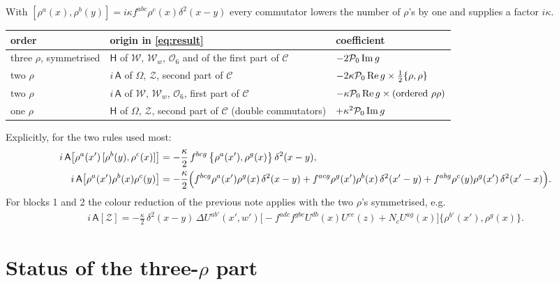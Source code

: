 \documentclass[10pt]{article}
\numberwithin{equation}{section}
\begin{document}
With $[\rho^{a}(x),\rho^{b}(y)]=i\kappa f^{abc}\rho^{c}(x)\delta^{2}(x-y)$ every commutator lowers the number of $\rho$'s by one and supplies a factor $i\kappa$.
\begin{center}
\renewcommand{\arraystretch}{1.4}
\begin{tabular}{l|l|l}
order & origin in \eqref{eq:result} & coefficient\\ \hline
three $\rho$, symmetrised & $\mathsf{H}$ of $\mathcal{W}$, $\mathcal{W}_{w}$, $\mathcal{O}_{6}$ and of the first part of $\mathcal{C}$ & $-2\mathcal{P}_{0}\,{\rm Im}\,g$\\
two $\rho$ & $i\,\mathsf{A}$ of $\Omega$, $\mathcal{Z}$, second part of $\mathcal{C}$ & $-2\kappa\mathcal{P}_{0}\,{\rm Re}\,g\times\tfrac12\{\rho,\rho\}$\\
two $\rho$ & $i\,\mathsf{A}$ of $\mathcal{W}$, $\mathcal{W}_{w}$, $\mathcal{O}_{6}$, first part of $\mathcal{C}$ & $-\kappa\mathcal{P}_{0}\,{\rm Re}\,g\times(\text{ordered }\rho\rho)$\\
one $\rho$ & $\mathsf{H}$ of $\Omega$, $\mathcal{Z}$, second part of $\mathcal{C}$ (double commutators) & $+\kappa^{2}\mathcal{P}_{0}\,{\rm Im}\,g$
\end{tabular}
\end{center}
Explicitly, for the two rules used most:
\begin{align}
i\,\mathsf{A}\big[\rho^{a}(x')\,[\rho^{b}(y),\rho^{c}(x)]\big]&=-\frac{\kappa}{2}\,f^{bcg}\,\big\{\rho^{a}(x'),\rho^{g}(x)\big\}\,\delta^{2}(x-y),\notag\\
i\,\mathsf{A}\big[\rho^{a}(x')\rho^{b}(x)\rho^{c}(y)\big]&=-\frac{\kappa}{2}\Big(f^{bcg}\rho^{a}(x')\rho^{g}(x)\,\delta^{2}(x-y)+f^{acg}\rho^{g}(x')\rho^{b}(x)\,\delta^{2}(x'-y)+f^{abg}\rho^{c}(y)\rho^{g}(x')\,\delta^{2}(x'-x)\Big).
\end{align}
For blocks 1 and 2 the colour reduction of the previous note applies with the two $\rho$'s symmetrised, e.g.
\begin{align}
i\,\mathsf{A}[\mathcal{Z}]=-\frac{\kappa}{2}\,\delta^{2}(x-y)\,\Delta U^{ab'}(x',w')\Big[-f^{adc}f^{gbe}U^{db}(x)U^{ce}(z)+N_{c}U^{ag}(x)\Big]\big\{\rho^{b'}(x'),\rho^{g}(x)\big\}.
\end{align}

\section{Status of the three-$\rho$ part}
\end{document}
